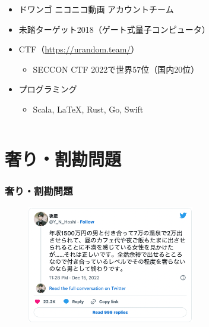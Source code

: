 \begin{frame}
\begin{columns}
\begin{column}{0.7\textwidth}
\begin{itemize}
        \item ドワンゴ ニコニコ動画 アカウントチーム

        \item 未踏ターゲット2018（ゲート式量子コンピュータ）

        \item CTF（\url{https://urandom.team/}）
        \begin{itemize}
          \item SECCON CTF 2022で世界57位（国内20位）
        \end{itemize}

        \item プログラミング
        \begin{itemize}
          \item Scala, \LaTeX, Rust, Go, Swift
        \end{itemize}
      \end{itemize}
    \end{column}
  \end{columns}
\end{frame}

\section{奢り・割勘問題}

\begin{frame}
  \frametitle{奢り・割勘問題}

  \begin{figure}[h]
    \includegraphics[width=0.65\textwidth]{./img/twitter.png}\cite{Y_N_Hoshi}
  \end{figure}
\end{frame}

